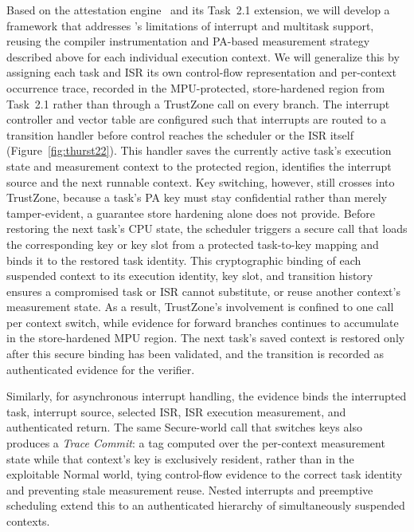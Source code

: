 Based on the \enola attestation engine~\cite{armanuzzaman2026enola} and its Task~2.1 extension, we will develop a framework that addresses \enola's limitations of interrupt and multitask support, reusing the compiler instrumentation and PA-based measurement strategy described above for each individual execution context.
We will generalize this by assigning each task and ISR its own control-flow representation and per-context occurrence trace, recorded in the MPU-protected, store-hardened region from Task~2.1 rather than through a TrustZone call on every branch.
The interrupt controller and vector table are configured such that interrupts are routed to a transition handler before control reaches the scheduler or the ISR itself (Figure~\ref{fig:thurst22}).
This handler saves the currently active task's execution state and measurement context to the protected region, identifies the interrupt source and the next runnable context.
Key switching, however, still crosses into TrustZone, because a task's PA key must stay confidential rather than merely tamper-evident, a guarantee store hardening alone does not provide.
Before restoring the next task's CPU state, the scheduler triggers a secure call that loads the corresponding key or key slot from a protected task-to-key mapping and binds it to the restored task identity.
This cryptographic binding of each suspended context to its execution identity, key slot, and transition history ensures a compromised task or ISR cannot substitute, or reuse another context's measurement state.
As a result, TrustZone's involvement is confined to one call per context switch, while evidence for forward branches continues to accumulate in the store-hardened MPU region.
The next task's saved context is restored only after this secure binding has been validated, and the transition is recorded as authenticated evidence for the verifier.

Similarly, for asynchronous interrupt handling, the evidence binds the interrupted task, interrupt source, selected ISR, ISR execution measurement, and authenticated return.
The same Secure-world call that switches keys also produces a \emph{Trace Commit}: a tag computed over the per-context measurement state while that context's key is exclusively resident, rather than in the exploitable Normal world, tying control-flow evidence to the correct task identity and preventing stale measurement reuse.
Nested interrupts and preemptive scheduling extend this to an authenticated hierarchy of simultaneously suspended contexts.

